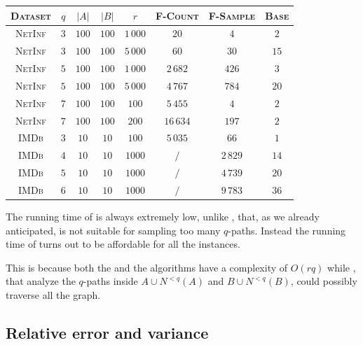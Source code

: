\begin{table}[h]
	\centering
	\begin{tabular}{|c|c|c|c|c|c|c|c|}
		\hline
		\textsc{Dataset} & $q$ & $|A|$ & $|B|$ & $r$      & \textsc{F-Count} & \textsc{F-Sample} & \textsc{Base} \\ \hline \hline
		\textsc{NetInf}  & $3$ & $100$ & $100$ & $1\,000$ & $20$             & $4$               & $2$           \\ \hline
		\textsc{NetInf}  & $3$ & $100$ & $100$ & $5\,000$ & $60$             & $30$              & $15$          \\ \hline
		\textsc{NetInf}  & $5$ & $100$ & $100$ & $1\,000$ & $2\,682$         & $426$             & $3$           \\ \hline
		\textsc{NetInf}  & $5$ & $100$ & $100$ & $5\,000$ & $4\,767$         & $784$             & $20$          \\ \hline
		\textsc{NetInf}  & $7$ & $100$ & $100$ & $100$    & $5\,455$         & $4$               & $2$           \\ \hline
		\textsc{NetInf}  & $7$ & $100$ & $100$ & $200$    & $16\,634$        & $197$             & $2$           \\ \hline \hline
		\textsc{IMDb}    & $3$ & $10$  & $10$  & $100$    & $5\,035$         & $66$              & $1$           \\ \hline
		\textsc{IMDb}    & $4$ & $10$  & $10$  & $1000$   & $/$              & $2\,829$          & $14$          \\ \hline
		\textsc{IMDb}    & $5$ & $10$  & $10$  & $1000$   & $/$              & $4\,739$          & $20$          \\ \hline
		\textsc{IMDb}    & $6$ & $10$  & $10$  & $1000$   & $/$              & $9\,783$          & $36$          \\ \hline
	\end{tabular}
\end{table}

The running time of \base is always extremely low, 
unlike \fcount, that, as we already anticipated, is not suitable for sampling too many $q$-paths.
Instead the running time of \fsamp turns out to be affordable for all the instances. 

This is because both the \fsamp and the \base algorithms have a complexity of $O(rq)$ while 
\fcount, that analyze the $q$-paths inside $A \cup N^{<q}(A)$ and $B \cup N^{<q}(B)$, could possibly traverse all the graph.

\subsection*{Relative error and variance}

